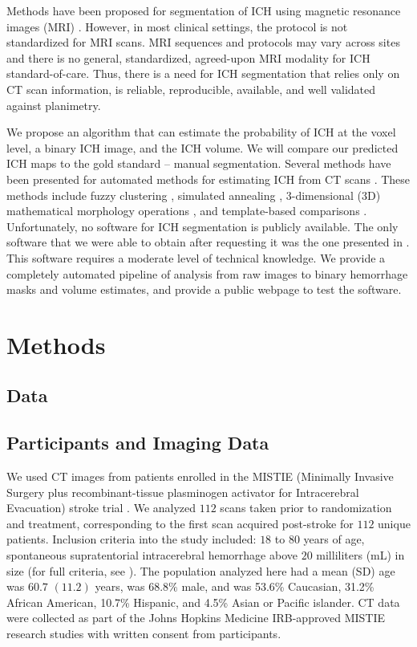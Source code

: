 \documentclass{elsarticle_nonatbib}\usepackage[]{graphicx}\usepackage[]{color}
\begin{document}
Methods have been proposed for segmentation of ICH using magnetic resonance images (MRI) \citep{wang_hematoma_2013, carhuapoma2003brain}.  However, in most clinical settings,
the protocol is not standardized for MRI scans.  MRI sequences and protocols may vary across sites and there is no general, standardized, agreed-upon MRI modality for ICH standard-of-care.
Thus, there is a need for ICH segmentation that relies only on CT scan information, is reliable, reproducible, available, and well validated against planimetry.

We propose an algorithm that can estimate the probability of ICH at the voxel level, a binary ICH image, and the ICH volume.  We will compare our predicted ICH maps to the gold standard -- manual segmentation.  Several methods have been presented for automated methods for estimating ICH from CT scans \citep{ gillebert_automated_2014, prakash_segmentation_2012, loncaric_hierarchical_1996, loncaric_quantitative_1999, perez_set_2007}.  These methods include fuzzy clustering \citep{prakash_segmentation_2012, loncaric_hierarchical_1996}, simulated annealing \citep{loncaric_quantitative_1999}, 3-dimensional (3D) mathematical morphology operations \citep{perez_set_2007}, and template-based comparisons \citep{gillebert_automated_2014}.  Unfortunately, no software for ICH segmentation is publicly available.   The only software that we were able to obtain after requesting it was the one presented in \citet{gillebert_automated_2014}. This software requires a moderate level of technical knowledge.  We provide a completely automated pipeline of analysis from raw images to binary hemorrhage masks and volume estimates, and provide a public webpage to test the software. 

\section{Methods}

\subsection{Data} 
\subsection{ Participants and Imaging Data }
We used CT images from patients enrolled in the MISTIE (Minimally Invasive Surgery plus recombinant-tissue plasminogen activator for Intracerebral Evacuation) stroke trial \citep{morgan_preliminary_2008_mistie}. We analyzed $112$ scans taken prior to randomization and treatment, corresponding to the first scan acquired post-stroke for $112$ unique patients.  Inclusion criteria into the study included: $18$ to $80$ years of age, spontaneous supratentorial intracerebral hemorrhage above $20$ milliliters (mL) in size (for full criteria, see \citet{mould_minimally_2013}).  The population analyzed here had a mean (SD) age was $60.7$ $(11.2)$ years, was $68.8\%$ male, and was 53.6\% Caucasian, 31.2\% African American, 10.7\% Hispanic, and 4.5\% Asian or Pacific islander.  CT data were collected as part of the Johns Hopkins Medicine IRB-approved MISTIE research studies with written consent from participants.  
\end{document}
